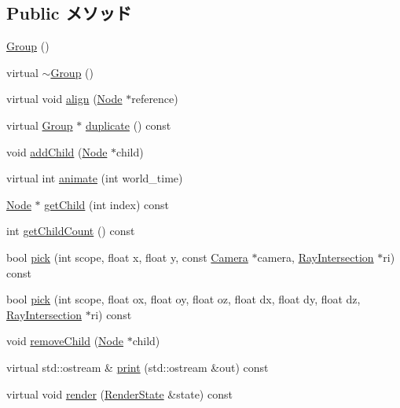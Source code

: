 \subsection*{Public メソッド}
\begin{CompactItemize}
\item 
\hyperlink{classm3g_1_1Group_0b29b9393b4b6856ac75b759f4166c13}{Group} ()
\item 
virtual \hyperlink{classm3g_1_1Group_a2a755272411c0d861f46f30970f5ca5}{$\sim$Group} ()
\item 
virtual void \hyperlink{classm3g_1_1Group_3db1b4be060fe3d4f3dbf9720ef85234}{align} (\hyperlink{classm3g_1_1Node}{Node} $\ast$reference)
\item 
virtual \hyperlink{classm3g_1_1Group}{Group} $\ast$ \hyperlink{classm3g_1_1Group_1212dbd493e73180a6204874bd97df6b}{duplicate} () const 
\item 
void \hyperlink{classm3g_1_1Group_f7c798f6f7924dc14403df261f82153a}{addChild} (\hyperlink{classm3g_1_1Node}{Node} $\ast$child)
\item 
virtual int \hyperlink{classm3g_1_1Group_8aad1ceab4c2a03609c8a42324ce484d}{animate} (int world\_\-time)
\item 
\hyperlink{classm3g_1_1Node}{Node} $\ast$ \hyperlink{classm3g_1_1Group_a3af7d07fde341ef751157d274538698}{getChild} (int index) const 
\item 
int \hyperlink{classm3g_1_1Group_756d01dca16e146d69bb1881aca8fbb7}{getChildCount} () const 
\item 
bool \hyperlink{classm3g_1_1Group_cfd72d6baf225d638f1436bb45e958dd}{pick} (int scope, float x, float y, const \hyperlink{classm3g_1_1Camera}{Camera} $\ast$camera, \hyperlink{classm3g_1_1RayIntersection}{RayIntersection} $\ast$ri) const 
\item 
bool \hyperlink{classm3g_1_1Group_10a3c77fa36fdb5d09b2bf39fe2a7c0b}{pick} (int scope, float ox, float oy, float oz, float dx, float dy, float dz, \hyperlink{classm3g_1_1RayIntersection}{RayIntersection} $\ast$ri) const 
\item 
void \hyperlink{classm3g_1_1Group_7415646c6f397f080d198176df44395c}{removeChild} (\hyperlink{classm3g_1_1Node}{Node} $\ast$child)
\item 
virtual std::ostream \& \hyperlink{classm3g_1_1Group_6fea17fa1532df3794f8cb39cb4f911f}{print} (std::ostream \&out) const 
\item 
virtual void \hyperlink{classm3g_1_1Group_8babc8a79b78615da51161e94029eea9}{render} (\hyperlink{structm3g_1_1RenderState}{RenderState} \&state) const 
\end{CompactItemize}
